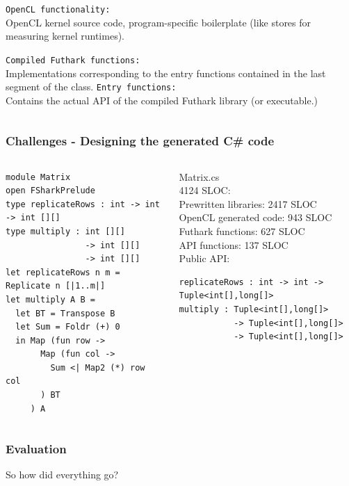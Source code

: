 \documentclass[10pt, compress, usenames, dvipsnames]{beamer}
\begin{document}
\begin{frame}[fragile]
\begin{columns}
\begin{column}{.48\textwidth}
\begin{overprint}
      {
      \texttt{OpenCL functionality:}\\
      OpenCL kernel source code, program-specific boilerplate (like stores for
      measuring kernel runtimes).
      }

      {
      \texttt{Compiled Futhark functions:}\\
      Implementations corresponding to the entry functions contained in the
      last segment of the class.
      }
      {
      \texttt{Entry functions:}\\
      Contains the actual API of the compiled Futhark library (or executable.)
      }
      \end{overprint}
    \end{column}
  \end{columns}
\end{frame}

\begin{frame}[fragile]
  \frametitle{Challenges - Designing the generated C\# code}
  \begin{columns}
    \begin{column}{.48\textwidth}
\begin{verbatim}
module Matrix
open FSharkPrelude
type replicateRows : int -> int -> int [][] 
type multiply : int [][] 
                -> int [][] 
                -> int [][]
let replicateRows n m = Replicate n [|1..m|]
let multiply A B =
  let BT = Transpose B
  let Sum = Foldr (+) 0
  in Map (fun row ->
       Map (fun col -> 
         Sum <| Map2 (*) row col
       ) BT
     ) A
\end{verbatim}
    \end{column}
    \begin{column}{.48\textwidth}
      {\scriptsize
      Matrix.cs\\
      4124 SLOC:\\
      
      Prewritten libraries: 2417 SLOC\\
      OpenCL generated code: 943 SLOC\\
      Futhark functions: 627 SLOC\\
      API functions: 137 SLOC\\
      
      Public API:
      }
    \begin{verbatim}
replicateRows : int -> int -> Tuple<int[],long[]>
multiply : Tuple<int[],long[]> 
           -> Tuple<int[],long[]> 
           -> Tuple<int[],long[]>
\end{verbatim}
    \end{column}
  \end{columns}
\end{frame}
\begin{frame}[fragile]
  \frametitle{Evaluation}
  \begin{center}
    \Huge So how did everything go?
  \end{center}
\end{frame}
\end{document}
